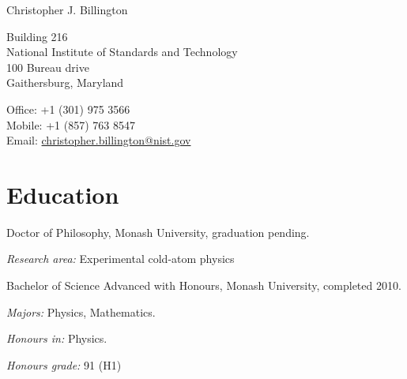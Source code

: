 \documentclass[10pt,letterpaper]{article}
\def\name{Christopher J. Billington}
\renewenvironment{itemize}{
  \begin{list}{}{
    \setlength{\leftmargin}{1.5em}
    \setlength{\itemsep}{0.25em}
    \setlength{\parskip}{0pt}
    \setlength{\parsep}{0.25em}
  }
}{
  \end{list}
}
\begin{document}
{\huge \name}

\bigskip

\begin{minipage}[t]{0.5\textwidth}
  Building 216 \\
  National Institute of Standards and Technology \\
  100 Bureau drive \\
  Gaithersburg, Maryland
\end{minipage}
\begin{minipage}[t]{0.5\textwidth}
  Office: +1 (301) 975 3566 \\
  Mobile: +1 (857) 763 8547 \\
  Email: \href{mailto:christopher.billington@nist.gov}{christopher.billington@nist.gov} \\
\end{minipage}

\section*{Education}

\begin{itemize}

  \item Doctor of Philosophy, Monash University, graduation pending.
    \begin{itemize}
    \item \textit{Research area:}
      Experimental cold-atom physics
    \end{itemize}
    
  \item Bachelor of Science Advanced with Honours, Monash University, completed 2010.
    \begin{itemize}
    \item \textit{Majors:}
      Physics, Mathematics.
    \item \textit{Honours in:}
      Physics.
    \item \textit{Honours grade:} 91 (H1)
    \end{itemize}
    
  
\end{itemize}
\end{document}
